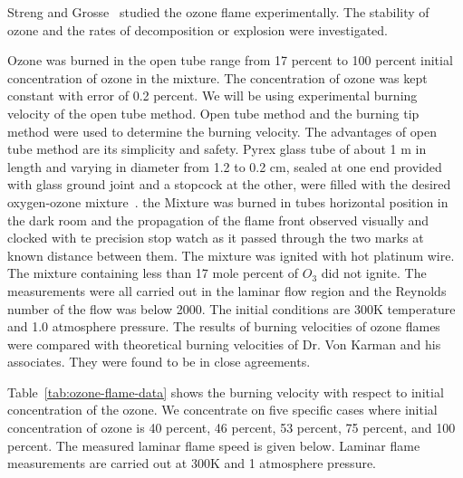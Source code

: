 Streng and Grosse~\cite{Streng} studied the ozone
flame experimentally. The stability of ozone and the rates of
decomposition or explosion were investigated.%
 
Ozone was burned in the open tube
range from 17 percent to 100 percent initial concentration of ozone in
the mixture. 
The concentration of ozone was kept constant with error of 0.2
percent. We will be using experimental
burning velocity of the open tube method. Open tube method and the burning tip method were used to determine the burning velocity. The advantages of open tube method are its simplicity and safety. 
Pyrex glass tube of about 1 m in length and varying in diameter from 1.2 to 0.2 cm, sealed at one end provided with glass ground joint and a stopcock at the other, were filled with the desired oxygen-ozone mixture~\cite{Streng}.
the Mixture was burned in tubes horizontal position in the dark room and the propagation of the flame front observed visually and clocked with te precision stop watch as it passed through the two marks at known distance between them. The mixture was ignited with hot platinum wire. The mixture containing less than 17 mole percent of $O_3$ did not ignite.   The measurements were all carried out in the laminar
flow region and the Reynolds number of the flow was below 2000. The
initial conditions are 300K temperature and 1.0 atmosphere
pressure. The results of burning velocities of ozone flames were
compared with theoretical burning velocities of Dr. Von Karman and his
associates. They were found to be in close agreements.



Table~\ref{tab:ozone-flame-data} shows the burning
velocity with respect to initial concentration of the ozone. We
concentrate on five specific cases where initial concentration of ozone
is 40 percent, 46 percent, 53 percent, 75 percent, and 100 percent. The
measured laminar flame speed is given below. Laminar flame
measurements are carried out at 300K and 1 atmosphere pressure.


